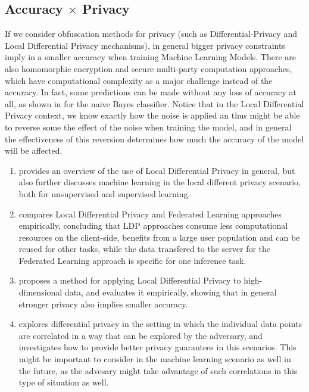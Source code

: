 \subsection{Accuracy $\times$ Privacy}

If we consider obfuscation methods for privacy (such as Differential-Privacy and Local Differential Privacy mechanisms), in general bigger privacy constraints imply in a smaller accuracy when training Machine Learning Models. There are also homomorphic encryption and secure multi-party computation approaches, which have computational complexity as a major challenge instead of the accuracy. In fact, some predictions can be made without any loss of accuracy at all, as shown in \cite{Privacy-preserving classification of customer data without loss of accuracy} for the naive Bayes classifier. Notice that in the Local Differential Privacy context, we know exactly how the noise is applied an thus might be able to reverse some the effect of the noise when training the model, and in general the effectiveness of this reversion determines how much the accuracy of the model will be affected.

\begin{enumerate}
\item \cite{Local differential privacy and its applications: A comprehensive survey} provides an overview of the use of Local Differential Privacy in general, but also further discusses machine learning in the local different privacy scenario, both for unsupervised and supervised learning.
\item \cite{Preserving User Privacy for Machine Learning: Local Differential Privacy or Federated Machine Learning?} compares Local Differential Privacy and Federated Learning approaches empirically, concluding that LDP approaches consume less computational resources on the client-side, benefits from a large user population and can be reused for other tasks, while the data transfered to the server for the Federated Learning approach is specific for one inference task.
\item \cite{LoPub : High-Dimensional Crowdsourced Data Publication With Local Differential Privacy} proposes a method for applying Local Differential Privacy to high-dimensional data, and evaluates it empirically, showing that in general stronger privacy also implies smaller accuracy.
\item \cite{About dependence between individuals: Dependence Makes You Vulnerable: Differential Privacy Under Dependent Tuples} explores differential privacy in the setting in which the individual data points are correlated in a way that can be explored by the adversary, and investigates how to provide better privacy guarantees in this scenarios. This might be important to consider in the machine learning scenario as well in the future, as the advesary might take advantage of such correlations in this type of situation as well.
\end{enumerate}

